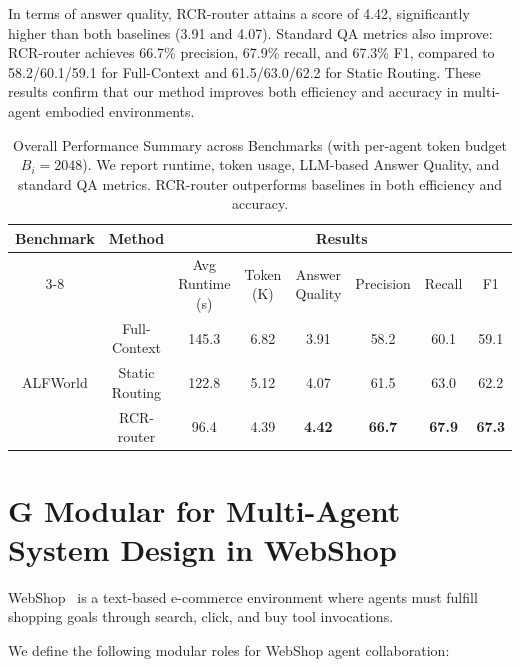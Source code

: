 In terms of answer quality, RCR-router attains a score of 4.42, significantly higher than both baselines (3.91 and 4.07). Standard QA metrics also improve: RCR-router achieves 66.7\% precision, 67.9\% recall, and 67.3\% F1, compared to 58.2/60.1/59.1 for Full-Context and 61.5/63.0/62.2 for Static Routing. These results confirm that our method improves both efficiency and accuracy in multi-agent embodied environments.

\begin{table}[t]
\centering
\caption{Overall Performance Summary across Benchmarks (with per-agent token budget $B_i = 2048$). We report runtime, token usage, LLM-based Answer Quality, and standard QA metrics. RCR-router outperforms baselines in both efficiency and accuracy.}
\label{tab:alfworld_results}
\begin{tabular}{c|c|c|c|c|c|c|c}
\toprule
\multirow{2}{*}{\textbf{Benchmark}} & \multirow{2}{*}{\textbf{Method}} & \multicolumn{6}{c}{\textbf{Results}} \\
\cline{3-8}
& & Avg Runtime (s) & Token (K) & Answer Quality & Precision & Recall & F1 \\
\midrule
\multirow{3}{*}{ALFWorld} 
& Full-Context    & 145.3 & 6.82 & 3.91 & 58.2 & 60.1 & 59.1 \\
& Static Routing  & 122.8 & 5.12 & 4.07 & 61.5 & 63.0 & 62.2 \\
& RCR-router      &  96.4 & 4.39 & \textbf{4.42} & \textbf{66.7} & \textbf{67.9} & \textbf{67.3} \\
\bottomrule
\end{tabular}
\end{table}


\section*{G \quad  Modular for Multi-Agent System Design in WebShop}
WebShop~\cite{yao2022webshop} is a text-based e-commerce environment where agents must fulfill shopping goals through search, click, and buy tool invocations.

We define the following modular roles for WebShop agent collaboration:

